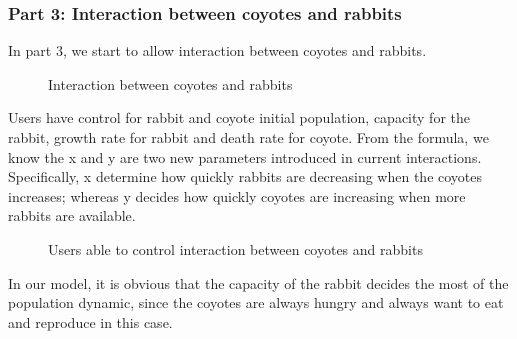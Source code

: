 \documentclass{article}
\begin{document}
\begin{normalsize}
	\subsubsection{Part 3: Interaction between coyotes and rabbits}
	In part 3, we start to allow interaction between coyotes and rabbits.
			\begin{figure}[H]
			\caption{Interaction between coyotes and rabbits}
		\end{figure}
	Users have control for rabbit and coyote initial population, capacity for the rabbit, growth rate for rabbit and death rate for coyote. From the formula, we know the x and y are two new parameters introduced in current interactions. Specifically, x  determine how quickly rabbits are decreasing when the coyotes increases; whereas y decides how quickly coyotes are increasing when more rabbits are available.
	\begin{figure}[H]
		\caption{Users able to control interaction between coyotes and rabbits}
	\end{figure}
	In our model, it is obvious that the capacity of the rabbit decides the most of the population dynamic, since the coyotes are always hungry and always want to eat and reproduce in this case. 
	

\end{normalsize}
\end{document}
